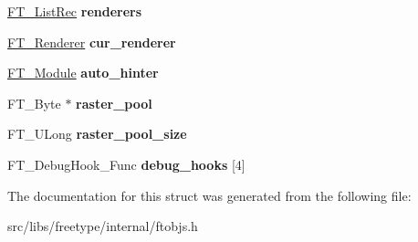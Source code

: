 \begin{DoxyCompactItemize}
\item 
\hypertarget{struct_f_t___library_rec___ad9503f71cf4e4d88edfbdda59eb5e43d}{
\hyperlink{struct_f_t___list_rec__}{FT\_\-ListRec} {\bfseries renderers}}
\label{struct_f_t___library_rec___ad9503f71cf4e4d88edfbdda59eb5e43d}

\item 
\hypertarget{struct_f_t___library_rec___a528dd3298756070ecad7d0f82f009294}{
\hyperlink{struct_f_t___renderer_rec__}{FT\_\-Renderer} {\bfseries cur\_\-renderer}}
\label{struct_f_t___library_rec___a528dd3298756070ecad7d0f82f009294}

\item 
\hypertarget{struct_f_t___library_rec___ae608b33b223905d4d70b782ed7ec8c78}{
\hyperlink{struct_f_t___module_rec__}{FT\_\-Module} {\bfseries auto\_\-hinter}}
\label{struct_f_t___library_rec___ae608b33b223905d4d70b782ed7ec8c78}

\item 
\hypertarget{struct_f_t___library_rec___aa8dd799d2efb7817b05c4a02a6828275}{
FT\_\-Byte $\ast$ {\bfseries raster\_\-pool}}
\label{struct_f_t___library_rec___aa8dd799d2efb7817b05c4a02a6828275}

\item 
\hypertarget{struct_f_t___library_rec___a798afdcaf0cda349eb454b769abfa251}{
FT\_\-ULong {\bfseries raster\_\-pool\_\-size}}
\label{struct_f_t___library_rec___a798afdcaf0cda349eb454b769abfa251}

\item 
\hypertarget{struct_f_t___library_rec___a1ba1f5abd0254a22dae533a9ac971b84}{
FT\_\-DebugHook\_\-Func {\bfseries debug\_\-hooks} \mbox{[}4\mbox{]}}
\label{struct_f_t___library_rec___a1ba1f5abd0254a22dae533a9ac971b84}

\end{DoxyCompactItemize}


The documentation for this struct was generated from the following file:\begin{DoxyCompactItemize}
\item 
src/libs/freetype/internal/ftobjs.h\end{DoxyCompactItemize}
